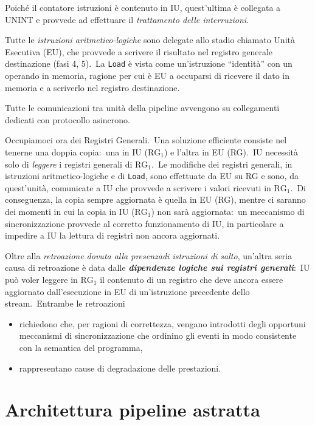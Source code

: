 Poiché il contatore istruzioni è contenuto in IU, quest'ultima è collegata a UNINT e provvede ad effettuare il \textit{trattamento delle interruzioni}.

Tutte le \textit{istruzioni aritmetico-logiche} sono delegate allo stadio chiamato Unità Esecutiva (EU), che provvede a scrivere il risultato nel registro generale destinazione (fasi 4, 5).\
La \texttt{Load} è vista come un'istruzione ``identità'' con un operando in memoria, ragione per cui è EU a occuparsi di ricevere il dato in memoria e a scriverlo nel registro destinazione.

Tutte le comunicazioni tra unità della pipeline avvengono su collegamenti dedicati con protocollo asincrono.

Occupiamoci ora dei Registri Generali.\
Una soluzione efficiente consiste nel tenerne una doppia copia:\ una in IU ($\mathrm{RG}_1$) e l'altra in EU (RG).\
IU necessità solo di \textit{leggere} i registri generali di $\mathrm{RG}_1$.\
Le modifiche dei registri generali, in istruzioni aritmetico-logiche e di \texttt{Load}, sono effettuate da EU su RG e sono, da quest'unità, comunicate a IU che provvede a scrivere i valori ricevuti in $\mathrm{RG}_1$.\
Di conseguenza, la copia sempre aggiornata è quella in EU (RG), mentre ci saranno dei momenti in cui la copia in IU ($\mathrm{RG}_1$) non sarà aggiornata:\ un meccanismo di sincronizzazione provvede al corretto funzionamento di IU, in particolare a impedire a IU la lettura di registri non ancora aggiornati.

Oltre alla \textit{retroazione dovuta alla presenzadi istruzioni di salto}, un'altra seria causa di retroazione è data dalle \textbf{\textit{dipendenze logiche sui registri generali}}:\ IU può voler leggere in $\mathrm{RG}_1$ il contenuto di un registro che deve ancora essere aggiornato dall'esecuzione in EU di un'istruzione precedente dello stream.\
Entrambe le retroazioni

\begin{itemize}
    \item richiedono che, per ragioni di correttezza, vengano introdotti degli opportuni meccanismi di sincronizzazione che ordinino gli eventi in modo consistente con la semantica del programma,
    \item rappresentano cause di degradazione delle prestazioni.
\end{itemize}

\section{Architettura pipeline astratta}

